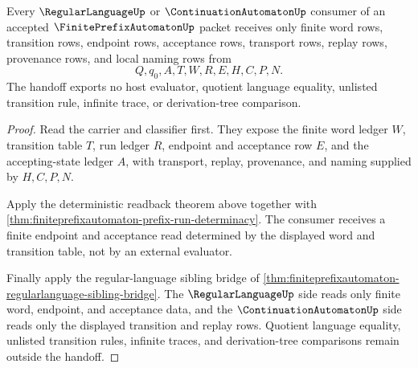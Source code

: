 \begin{theorem}
\label{thm:finite-prefix-automaton-regular-language-handoff}
Every $\RegularLanguageUp$ or $\ContinuationAutomatonUp$ consumer of an accepted $\FinitePrefixAutomatonUp$ packet receives only finite word rows, transition rows, endpoint rows, acceptance rows, transport rows, replay rows, provenance rows, and local naming rows from
$$
Q,q_0,A,T,W,R,E,H,C,P,N .
$$
The handoff exports no host evaluator, quotient language equality, unlisted transition rule, infinite trace, or derivation-tree comparison.
\end{theorem}
\begin{proof}
Read the carrier and classifier first. They expose the finite word ledger $W$, transition table $T$, run ledger $R$, endpoint and acceptance row $E$, and the accepting-state ledger $A$, with transport, replay, provenance, and naming supplied by $H,C,P,N$.

Apply the deterministic readback theorem above together with \autoref{thm:finiteprefixautomaton-prefix-run-determinacy}. The consumer receives a finite endpoint and acceptance read determined by the displayed word and transition table, not by an external evaluator.

Finally apply the regular-language sibling bridge of \autoref{thm:finiteprefixautomaton-regularlanguage-sibling-bridge}. The $\RegularLanguageUp$ side reads only finite word, endpoint, and acceptance data, and the $\ContinuationAutomatonUp$ side reads only the displayed transition and replay rows. Quotient language equality, unlisted transition rules, infinite traces, and derivation-tree comparisons remain outside the handoff.
\end{proof}

